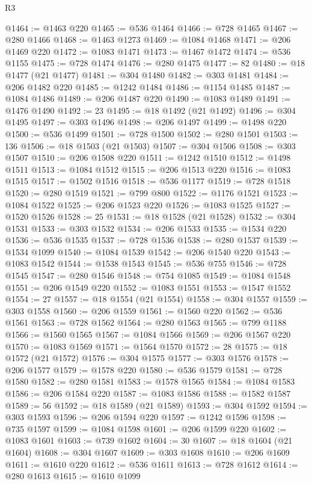 \begin{lexlean}{R3}
\begin{coremodule}
@1464 := @1463 @220
@1465 := @536 @1464
@1466 := @728 @1465
@1467 := @280 @1466
@1468 := @1463 @1273
@1469 := @1084 @1468
@1471 := @206 @1469 @220
@1472 := @1083 @1471
@1473 := @1467 @1472
@1474 := @536 @1155
@1475 := @728 @1474
@1476 := @280 @1475
@1477 := 82
@1480 := @18 @1477 (@21 @1477)
@1481 := @304 @1480
@1482 := @303 @1481
@1484 := @206 @1482 @220
@1485 := @1242 @1484
@1486 := @1154 @1485
@1487 := @1084 @1486
@1489 := @206 @1487 @220
@1490 := @1083 @1489
@1491 := @1476 @1490
@1492 := 23
@1495 := @18 @1492 (@21 @1492)
@1496 := @304 @1495
@1497 := @303 @1496
@1498 := @206 @1497
@1499 := @1498 @220
@1500 := @536 @1499
@1501 := @728 @1500
@1502 := @280 @1501
@1503 := 136
@1506 := @18 @1503 (@21 @1503)
@1507 := @304 @1506
@1508 := @303 @1507
@1510 := @206 @1508 @220
@1511 := @1242 @1510
@1512 := @1498 @1511
@1513 := @1084 @1512
@1515 := @206 @1513 @220
@1516 := @1083 @1515
@1517 := @1502 @1516
@1518 := @536 @1177
@1519 := @728 @1518
@1520 := @280 @1519
@1521 := @799 @800
@1522 := @1176 @1521
@1523 := @1084 @1522
@1525 := @206 @1523 @220
@1526 := @1083 @1525
@1527 := @1520 @1526
@1528 := 25
@1531 := @18 @1528 (@21 @1528)
@1532 := @304 @1531
@1533 := @303 @1532
@1534 := @206 @1533
@1535 := @1534 @220
@1536 := @536 @1535
@1537 := @728 @1536
@1538 := @280 @1537
@1539 := @1534 @1099
@1540 := @1084 @1539
@1542 := @206 @1540 @220
@1543 := @1083 @1542
@1544 := @1538 @1543
@1545 := @536 @755
@1546 := @728 @1545
@1547 := @280 @1546
@1548 := @754 @1085
@1549 := @1084 @1548
@1551 := @206 @1549 @220
@1552 := @1083 @1551
@1553 := @1547 @1552
@1554 := 27
@1557 := @18 @1554 (@21 @1554)
@1558 := @304 @1557
@1559 := @303 @1558
@1560 := @206 @1559
@1561 := @1560 @220
@1562 := @536 @1561
@1563 := @728 @1562
@1564 := @280 @1563
@1565 := @799 @1188
@1566 := @1560 @1565
@1567 := @1084 @1566
@1569 := @206 @1567 @220
@1570 := @1083 @1569
@1571 := @1564 @1570
@1572 := 28
@1575 := @18 @1572 (@21 @1572)
@1576 := @304 @1575
@1577 := @303 @1576
@1578 := @206 @1577
@1579 := @1578 @220
@1580 := @536 @1579
@1581 := @728 @1580
@1582 := @280 @1581
@1583 := @1578 @1565
@1584 := @1084 @1583
@1586 := @206 @1584 @220
@1587 := @1083 @1586
@1588 := @1582 @1587
@1589 := 56
@1592 := @18 @1589 (@21 @1589)
@1593 := @304 @1592
@1594 := @303 @1593
@1596 := @206 @1594 @220
@1597 := @1242 @1596
@1598 := @735 @1597
@1599 := @1084 @1598
@1601 := @206 @1599 @220
@1602 := @1083 @1601
@1603 := @739 @1602
@1604 := 30
@1607 := @18 @1604 (@21 @1604)
@1608 := @304 @1607
@1609 := @303 @1608
@1610 := @206 @1609
@1611 := @1610 @220
@1612 := @536 @1611
@1613 := @728 @1612
@1614 := @280 @1613
@1615 := @1610 @1099

\end{coremodule}
\end{lexlean}
